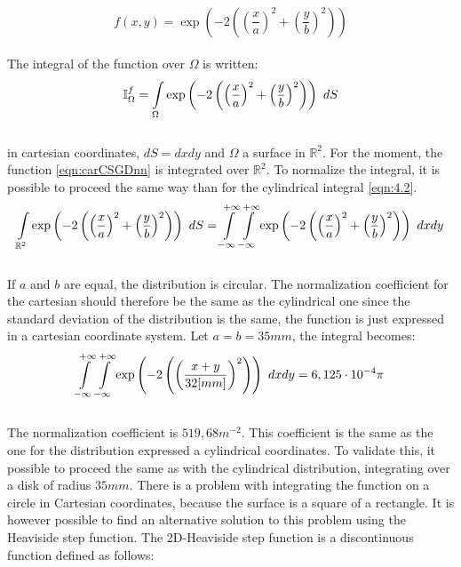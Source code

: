 \\ 
\begin{equation}
    f(x,y) = \exp\left(-2\left(\left(\frac{x}{a}\right)^2 + \left(\frac{y}{b}\right)^2 \right) \right)
    \label{eqn:carCSGDnn}
\end{equation}
\\
\normalsize{The integral of the function over $\Omega$ is written:}
\\ 
\begin{equation}
    \mathbb{I}_{\Omega}^f = \int\displaylimits_{\Omega} \exp\left(-2\left(\left(\frac{x}{a}\right)^2 + \left(\frac{y}{b}\right)^2 \right) \right) \ dS
\end{equation}
\\
\normalsize{in cartesian coordinates, \it{$dS = dxdy$}}
\normalsize{and $\Omega$ a surface in $\mathbb{R}^2$. For the moment, the function \eqref{eqn:carCSGDnn} is integrated over $\mathbb{R}^2$. To normalize the integral, it is possible to proceed the same way than for the cylindrical integral \eqref{eqn:4.2}. }
\\
\begin{equation}
    \int\displaylimits_{\mathbb{R}^2} \exp\left(-2\left(\left(\frac{x}{a}\right)^2 + \left(\frac{y}{b}\right)^2 \right) \right) \ dS = \int\displaylimits_{- \infty}^{+ \infty} \int\displaylimits_{- \infty}^{+ \infty} \exp\left(-2\left(\left(\frac{x}{a}\right)^2 + \left(\frac{y}{b}\right)^2 \right) \right) \ dxdy
\end{equation}
\\
\normalsize{If $a$ and $b$ are equal, the distribution is circular. The normalization coefficient for the cartesian should therefore be the same as the cylindrical one since the standard deviation of the distribution is the same, the function is just expressed in a cartesian coordinate system. Let $a = b = 35mm$, the integral becomes:}
\\
\begin{equation}
    \int\displaylimits_{- \infty}^{+ \infty} \int\displaylimits_{- \infty}^{+ \infty} \exp\left(-2\left(\left(\frac{x+y}{32[mm]}\right)^2 \right) \right) \ dxdy = 6,125 \cdot 10^{-4} \pi
\end{equation}
\\
\normalsize{The normalization coefficient is $519,68 m^{-2}$. This coefficient is the same as the one for the distribution expressed a cylindrical coordinates. To validate this, it possible to proceed the same as with the cylindrical distribution, integrating over a disk of radius $35mm$. There is a problem with integrating the function on a circle in Cartesian coordinates, because the surface is a square of a rectangle. It is however possible to find an alternative solution to this problem using the Heaviside step function. The 2D-Heaviside step function is a discontinuous function defined as follows:}
